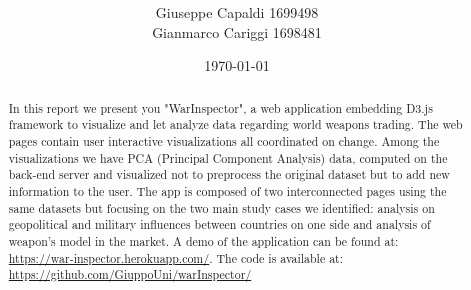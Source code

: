 \documentclass{article}
\title{\vspace{-2.0cm}\spacecaps{WarInspector: Visual Analytics web application on Arms Transfer}\\ \normalsize \spacesc{Visual Analytics Course - Sapienza University of Rome} }
\author{Giuseppe Capaldi 1699498\\ Gianmarco Cariggi 1698481}
\date{\today}
\begin{document}
\maketitle
\begin{abstract}

In this report we present you "WarInspector", a web application embedding D3.js framework to visualize and let analyze data regarding world weapons trading. The web pages contain user interactive visualizations all coordinated on change. Among the visualizations we have PCA (Principal Component Analysis) data, computed on the back-end server and visualized not to preprocess the original dataset but to add new information to the user. The app is composed of two interconnected pages using the same datasets but focusing on the two main study cases we identified:  analysis on geopolitical and military influences between countries on one side and analysis of weapon's model in the market. A demo of the application can be found at:
\url{https://war-inspector.herokuapp.com/}. The code is available at: \url{https://github.com/GiuppoUni/warInspector/}
%
\end{abstract}
\end{document}
